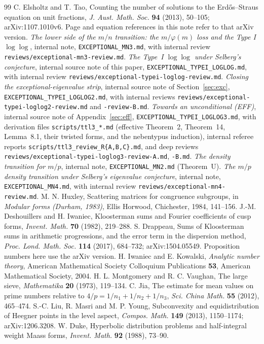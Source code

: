 \documentclass[10pt,reqno]{amsart}
\theoremstyle{definition}
\numberwithin{equation}{section}
\begin{document}
\begin{thebibliography}{99}
 C. Elsholtz and T. Tao, Counting the number of solutions to the Erd\H{o}s--Straus equation on unit fractions, \emph{J. Aust. Math. Soc.} \textbf{94} (2013), 50--105; arXiv:1107.1010v6. Page and equation references in this note refer to that arXiv version.
 \emph{The lower side of the $m/n$ transition: the $m/\varphi(m)$ loss and the Type I $\log\log$}, internal note, \texttt{EXCEPTIONAL\_MN3.md}, with internal review \texttt{reviews/exceptional-mn3-review.md}.
 \emph{The Type~I $\log\log$ under Selberg's conjecture}, internal source note of this paper, \texttt{EXCEPTIONAL\_TYPEI\_LOGLOG.md}, with internal review \texttt{reviews/exceptional-typei-loglog-review.md}.
 \emph{Closing the exceptional-eigenvalue strip}, internal source note of Section~\ref{sec:exc}, \texttt{EXCEPTIONAL\_TYPEI\_LOGLOG2.md}, with internal reviews \texttt{reviews/exceptional-typei-loglog2-review.md} and \texttt{-review-B.md}.
 \emph{Towards an unconditional (EFF)}, internal source note of Appendix~\ref{sec:eff}, \texttt{EXCEPTIONAL\_TYPEI\_LOGLOG3.md}, with derivation files \texttt{scripts/ttl3\_*.md} (effective Theorem~2, Theorem~14, Lemma~8.1, their twisted forms, and the nebentypus induction), internal referee reports \texttt{scripts/ttl3\_review\_R\{A,B,C\}.md}, and deep reviews \texttt{reviews/exceptional-typei-loglog3-review-A.md}, \texttt{-B.md}.
 \emph{The density transition for $m/p$}, internal note, \texttt{EXCEPTIONAL\_MN2.md} (Theorem~U).
 \emph{The $m/p$ density transition under Selberg's eigenvalue conjecture}, internal note, \texttt{EXCEPTIONAL\_MN4.md}, with internal review \texttt{reviews/exceptional-mn4-review.md}.
 M. N. Huxley, Scattering matrices for congruence subgroups, in \emph{Modular forms (Durham, 1983)}, Ellis Horwood, Chichester, 1984, 141--156.
 J.-M. Deshouillers and H. Iwaniec, Kloosterman sums and Fourier coefficients of cusp forms, \emph{Invent. Math.} \textbf{70} (1982), 219--288.
 S. Drappeau, Sums of Kloosterman sums in arithmetic progressions, and the error term in the dispersion method, \emph{Proc. Lond. Math. Soc.} \textbf{114} (2017), 684--732; arXiv:1504.05549. Proposition numbers here use the arXiv version.
 H. Iwaniec and E. Kowalski, \emph{Analytic number theory}, American Mathematical Society Colloquium Publications \textbf{53}, American Mathematical Society, 2004.
 H. L. Montgomery and R. C. Vaughan, The large sieve, \emph{Mathematika} \textbf{20} (1973), 119--134.
 C. Jia, The estimate for mean values on prime numbers relative to $4/p=1/n_1+1/n_2+1/n_3$, \emph{Sci. China Math.} \textbf{55} (2012), 465--474.
 S.-C. Liu, R. Masri and M. P. Young, Subconvexity and equidistribution of Heegner points in the level aspect, \emph{Compos. Math.} \textbf{149} (2013), 1150--1174; arXiv:1206.3208.
 W. Duke, Hyperbolic distribution problems and half-integral weight Maass forms, \emph{Invent. Math.} \textbf{92} (1988), 73--90.


\end{thebibliography}
\end{document}
